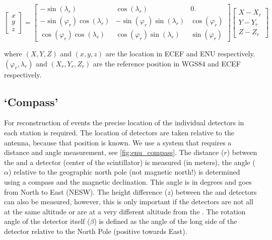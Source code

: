 \begin{equation}
    \begin{bmatrix}
        x \\
        y \\
        z
    \end{bmatrix}
    =
    \begin{bmatrix}
                        -\sin(\lambda_r) &                  \cos(\lambda_r) &              0. \\
        -\sin(\varphi_r) \cos(\lambda_r) & -\sin(\varphi_r) \sin(\lambda_r) & \cos(\varphi_r) \\
         \cos(\varphi_r) \cos(\lambda_r) &  \cos(\varphi_r) \sin(\lambda_r) & \sin(\varphi_r)
    \end{bmatrix}
    \begin{bmatrix}
        X - X_r \\
        Y - Y_r \\
        Z - Z_r
    \end{bmatrix}
\end{equation}

\noindent where $(X, Y, Z)$ and $(x, y, z)$ are the location in ECEF and
ENU respectively. $(\varphi_r, \lambda_r)$ and $(X_r, Y_r, Z_r)$ are the
reference position in WGS84 and ECEF respectively.


\subsection{`Compass'}

For reconstruction of events the precise location of the individual
detectors in each station is required. The location of detectors are
taken relative to the \gps antenna, because that position is known. We
use a system that requires a distance and angle measurement, see
\cref{fig:enu_compass}. The distance ($r$) between the \gps and a
detector (center of the scintillator) is measured (in meters), the angle
($\alpha$) relative to the geographic north pole (not magnetic north!)
is determined using a compass and the magnetic declination. This angle
is in degrees and goes from North to East (NESW). The height difference
($z$) between the \gps and detectors can also be measured, however, this
is only important if the detectors are not all at the same altitude or
are at a very different altitude from the \gps. The rotation angle of
the detector itself ($\beta$) is defined as the angle of the long side
of the detector relative to the North Pole (positive towards East).

